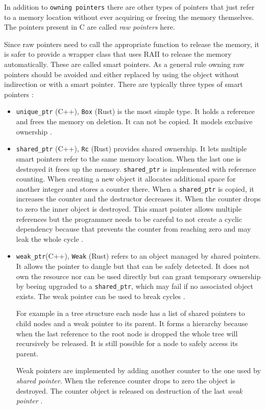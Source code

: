 \documentclass[conference,twocolumn]{IEEEtran}
\begin{document}
In addition to \verb|owning pointers| there are other types of pointers that just refer to a memory location without ever acquiring or freeing the memory themselves. The pointers present in C are called \emph{raw pointers} here.

Since raw pointers need to call the appropriate function to release the memory, it is safer to provide a wrapper class that uses RAII to release the memory automatically. These are called smart pointers. As a general rule owning raw pointers should be avoided and either replaced by using the object without indirection or with a smart pointer. There are typically three types of smart pointers \cite{meyers2014effective}:

\begin{itemize}
\item
\verb|unique_ptr| (C++), \verb|Box| (Rust) is the most simple type. It holds a reference and frees the memory on deletion. It can not be copied. It models exclusive ownership \cite{meyers2014effective}.

\item
\verb|shared_ptr| (C++), \verb|Rc| (Rust) provides shared ownership. It lets multiple smart pointers refer to the same memory location. When the last one is destroyed it frees up the memory. \verb|shared_ptr| is implemented with reference counting. When creating a new object it allocates additional space for another integer and stores a counter there. When a \verb|shared_ptr| is copied, it increases the counter and the destructor decreases it. When the counter drops to zero the inner object is destroyed. This smart pointer allows multiple references but the programmer needs to be careful to not create a cyclic dependency because that prevents the counter from reaching zero and may leak the whole cycle \cite{meyers2014effective}.

\item \verb|weak_ptr|(C++), \verb|Weak| (Rust) refers to an object managed by shared pointers. It allows the pointer to dangle but that can be safely detected. It does not own the resource nor can be used directly but can grant temporary ownership by beeing upgraded to a \verb|shared_ptr|, which may fail if no associated object exists. The weak pointer can be used to break cycles \cite{meyers2014effective}.

For example in a tree structure each node has a list of shared pointers to child nodes and a weak pointer to its parent. It forms a hierarchy because when the last reference to the root node is dropped the whole tree will recursively be released. It is still possible for a node to safely access its parent.

Weak pointers are implemented by adding another counter to the one used by \emph{shared pointer}. When the reference counter drops to zero the object is destroyed. The counter object is released on destruction of the last \emph{weak pointer} \cite{meyers2014effective}.
\end{itemize}
\end{document}
